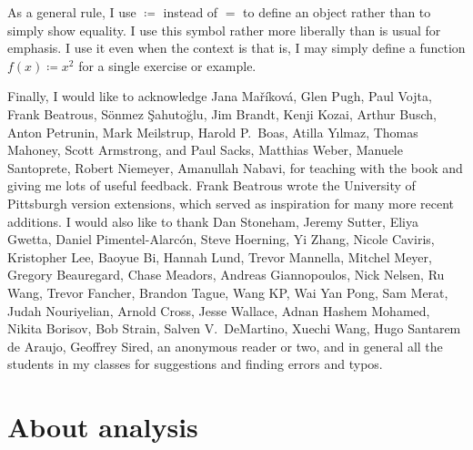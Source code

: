 As a general rule, I use $\coloneqq$ instead of $=$ to define an
object rather than to simply show equality.  I use this symbol rather more
liberally than is usual for emphasis.
I use it even when the context is 
that is, I may simply define a function $f(x) \coloneqq x^2$
for a single exercise or example.

\medskip

Finally, I would like to acknowledge Jana Ma\v{r}\'ikov\'a,
Glen Pugh, Paul Vojta, Frank Beatrous, S\"{o}nmez \c{S}ahuto\u{g}lu,
Jim Brandt, Kenji Kozai, Arthur Busch,  Anton Petrunin,
Mark Meilstrup, Harold P.\ Boas, Atilla Y{\i}lmaz,
Thomas Mahoney, Scott Armstrong, and Paul Sacks,
Matthias Weber, Manuele Santoprete,
Robert Niemeyer, Amanullah Nabavi,
for teaching with the book and giving me lots of useful feedback.
Frank Beatrous wrote the University of Pittsburgh version extensions, which
served as inspiration for many more recent additions.
I would also like to thank
Dan Stoneham, Jeremy Sutter, Eliya Gwetta, Daniel Pimentel-Alarc\'on,
Steve Hoerning, Yi Zhang, Nicole Caviris,
Kristopher Lee, Baoyue Bi, Hannah Lund,
Trevor Mannella, Mitchel Meyer, Gregory Beauregard,
Chase Meadors, Andreas Giannopoulos, Nick Nelsen,
Ru Wang, Trevor Fancher, Brandon Tague, Wang KP\@,
Wai Yan Pong, Sam Merat, Judah Nouriyelian,
Arnold Cross, Jesse Wallace,
Adnan Hashem Mohamed,
Nikita Borisov, Bob Strain,
Salven V.\ DeMartino,
Xuechi Wang,
Hugo Santarem de Araujo,
Geoffrey Sired,
an anonymous reader or two, and in general all the students in my classes
for suggestions and finding errors and typos.

\VolTwoIntro


\sectionnewpage
\section{About analysis} \label{sec:aboutra}

